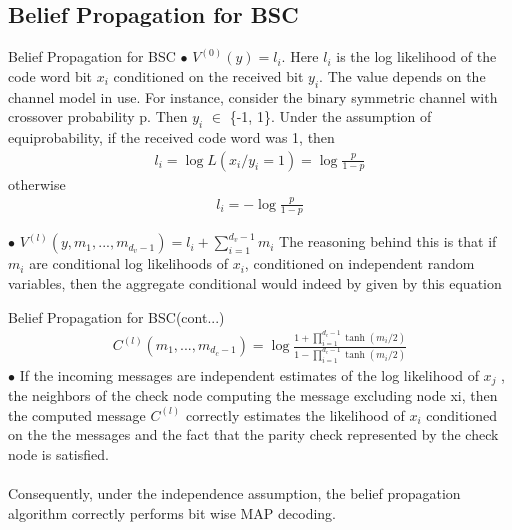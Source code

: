\subsection{Belief Propagation for BSC}
\begin{frame}{Belief Propagation for BSC}
$\bullet$ $V^{(0)}(y) = l_i$. Here $l_i$ is the log likelihood of the code word bit $x_i$ conditioned on the received bit $y_i$. The value depends on the channel model in use. For instance, consider the binary symmetric channel with crossover probability p. Then $y_i$ $\in$ \{-1, 1\}. Under the assumption of equiprobability, if the received code word was 1, then
 \begin{gather*}
     l_i = \log L(x_i/y_i = 1) = \log \frac{p}{1-p}
 \end{gather*} 
 otherwise 
 \begin{gather*}
     l_i = -\log\frac{p}{1-p}
 \end{gather*}

$\bullet$ $V^{(l)}(y, m_1, . . . , m_{d_v-1}) = l_i + $$\sum_{i=1}^{d_v-1} m_i$$ $ The reasoning behind this is that if $m_i$ are conditional log likelihoods of $x_i$, conditioned on independent random variables, then the
aggregate conditional would indeed by given by this equation
\end{frame}
\begin{frame}{Belief Propagation for BSC(cont...)}
\begin{gather*}
 C^{(l)}(m_1, . . . , m_{d_c-1})   = \log \frac{1 + \prod_{i=1}^{d_c-1} \tanh(m_i/2)}{1 - \prod_{i=1}^{d_c-1} \tanh(m_i/2)}
 \end{gather*}
$\bullet$  If the incoming messages are independent estimates of the log likelihood of $x_j$ , the neighbors of the check node computing the message excluding node xi, then the computed message $C^{(l)}$ correctly estimates the likelihood of $x_i$ conditioned on the the messages and the fact that the parity check represented by the check node is satisfied. \\~\\Consequently, under the independence assumption, the belief propagation algorithm correctly performs bit wise MAP decoding.
\end{frame}

